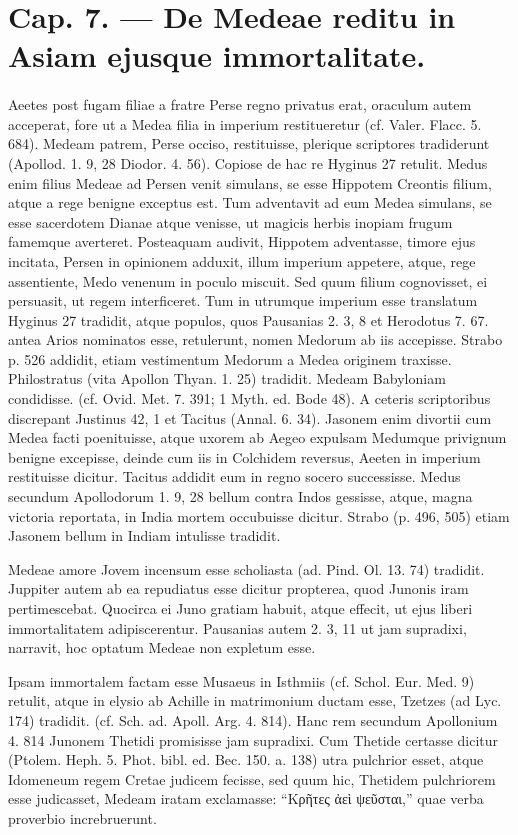 \documentclass[a4paper, 11pt, oneside, polutonikogreek, german]{article}
\begin{document}
\section{Cap. 7. --- De Medeae reditu in Asiam ejusque immortalitate.}
\paragraph{}
Aeetes post fugam filiae a fratre Perse regno privatus erat, oraculum autem acceperat, fore ut a Medea filia in imperium restitueretur (cf. Valer. Flacc. 5. 684). Medeam patrem, Perse occiso, restituisse, plerique scriptores tradiderunt (Apollod. 1. 9, 28 Diodor. 4. 56). Copiose de hac re Hyginus 27 retulit. Medus enim filius Medeae ad Persen venit simulans, se esse Hippotem Creontis filium, atque a rege benigne exceptus est. Tum adventavit ad eum Medea simulans, se esse sacerdotem Dianae atque venisse, ut magicis herbis inopiam frugum famemque averteret. Posteaquam audivit, Hippotem adventasse, timore ejus incitata, Persen in opinionem adduxit, illum imperium appetere, atque, rege assentiente, Medo venenum in poculo miscuit. Sed quum filium cognovisset, ei persuasit, ut regem interficeret. Tum in utrumque imperium esse translatum Hyginus 27 tradidit, atque populos, quos Pausanias 2. 3, 8 et Herodotus 7. 67. antea Arios nominatos esse, retulerunt, nomen Medorum ab iis accepisse. Strabo p. 526 addidit, etiam vestimentum Medorum a Medea originem traxisse. Philostratus (vita Apollon Thyan. 1. 25) tradidit. Medeam Babyloniam condidisse. (cf. Ovid. Met. 7. 391; 1 Myth. ed. Bode 48). A ceteris scriptoribus discrepant Justinus 42, 1 et Tacitus (Annal. 6. 34). Jasonem enim divortii cum Medea facti poenituisse, atque uxorem ab Aegeo expulsam Medumque privignum benigne excepisse, deinde cum iis in Colchidem reversus, Aeeten in imperium restituisse dicitur. Tacitus addidit eum in regno socero successisse. Medus secundum Apollodorum 1. 9, 28 bellum contra Indos gessisse, atque, magna victoria reportata, in India mortem occubuisse dicitur. Strabo (p. 496, 505) etiam Jasonem bellum in Indiam intulisse tradidit.

Medeae amore Jovem incensum esse scholiasta (ad. Pind. Ol. 13. 74) tradidit. Juppiter autem ab ea repudiatus esse dicitur propterea, quod Junonis iram pertimescebat. Quocirca ei Juno gratiam habuit, atque effecit, ut ejus liberi immortalitatem adipiscerentur. Pausanias autem 2. 3, 11 ut jam supradixi, narravit, hoc optatum Medeae non expletum esse.

Ipsam immortalem factam esse Musaeus in Isthmiis (cf. Schol. Eur. Med. 9) retulit, atque in elysio ab Achille in matrimonium ductam esse, Tzetzes (ad Lyc. 174) tradidit. (cf. Sch. ad. Apoll. Arg. 4. 814). Hanc rem secundum Apollonium 4. 814 Junonem Thetidi promisisse jam supradixi. Cum Thetide certasse dicitur (Ptolem. Heph. 5. Phot. bibl. ed. Bec. 150. a. 138) utra pulchrior esset, atque Idomeneum regem Cretae judicem fecisse, sed quum hic, Thetidem pulchriorem esse judicasset, Medeam iratam exclamasse: "`Κρῆτες ἀεὶ ψεῦσται,"' quae verba proverbio increbruerunt.
\end{document}
